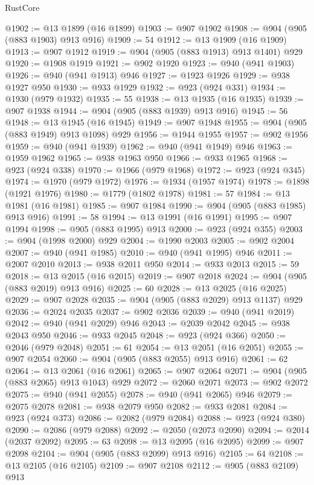 \begin{lexlean}{RustCore}
\begin{coremodule}
@1902 := @13 @1899 (@16 @1899)
@1903 := @907 @1902
@1908 := @904 (@905 (@883 @1903) @913 @916)
@1909 := 54
@1912 := @13 @1909 (@16 @1909)
@1913 := @907 @1912
@1919 := @904 (@905 (@883 @1913) @913 @1401) @929
@1920 := @1908 @1919
@1921 := @902 @1920
@1923 := @940 (@941 @1903)
@1926 := @940 (@941 @1913) @946
@1927 := @1923 @1926
@1929 := @938 @1927 @950
@1930 := @933 @1929
@1932 := @923 (@924 @331)
@1934 := @1930 (@979 @1932)
@1935 := 55
@1938 := @13 @1935 (@16 @1935)
@1939 := @907 @1938
@1944 := @904 (@905 (@883 @1939) @913 @916)
@1945 := 56
@1948 := @13 @1945 (@16 @1945)
@1949 := @907 @1948
@1955 := @904 (@905 (@883 @1949) @913 @1098) @929
@1956 := @1944 @1955
@1957 := @902 @1956
@1959 := @940 (@941 @1939)
@1962 := @940 (@941 @1949) @946
@1963 := @1959 @1962
@1965 := @938 @1963 @950
@1966 := @933 @1965
@1968 := @923 (@924 @338)
@1970 := @1966 (@979 @1968)
@1972 := @923 (@924 @345)
@1974 := @1970 (@979 @1972)
@1976 := @1934 (@1957 @1974)
@1978 := @1898 (@1921 @1976)
@1980 := @1779 (@1802 @1978)
@1981 := 57
@1984 := @13 @1981 (@16 @1981)
@1985 := @907 @1984
@1990 := @904 (@905 (@883 @1985) @913 @916)
@1991 := 58
@1994 := @13 @1991 (@16 @1991)
@1995 := @907 @1994
@1998 := @905 (@883 @1995) @913
@2000 := @923 (@924 @355)
@2003 := @904 (@1998 @2000) @929
@2004 := @1990 @2003
@2005 := @902 @2004
@2007 := @940 (@941 @1985)
@2010 := @940 (@941 @1995) @946
@2011 := @2007 @2010
@2013 := @938 @2011 @950
@2014 := @933 @2013
@2015 := 59
@2018 := @13 @2015 (@16 @2015)
@2019 := @907 @2018
@2024 := @904 (@905 (@883 @2019) @913 @916)
@2025 := 60
@2028 := @13 @2025 (@16 @2025)
@2029 := @907 @2028
@2035 := @904 (@905 (@883 @2029) @913 @1137) @929
@2036 := @2024 @2035
@2037 := @902 @2036
@2039 := @940 (@941 @2019)
@2042 := @940 (@941 @2029) @946
@2043 := @2039 @2042
@2045 := @938 @2043 @950
@2046 := @933 @2045
@2048 := @923 (@924 @366)
@2050 := @2046 (@979 @2048)
@2051 := 61
@2054 := @13 @2051 (@16 @2051)
@2055 := @907 @2054
@2060 := @904 (@905 (@883 @2055) @913 @916)
@2061 := 62
@2064 := @13 @2061 (@16 @2061)
@2065 := @907 @2064
@2071 := @904 (@905 (@883 @2065) @913 @1043) @929
@2072 := @2060 @2071
@2073 := @902 @2072
@2075 := @940 (@941 @2055)
@2078 := @940 (@941 @2065) @946
@2079 := @2075 @2078
@2081 := @938 @2079 @950
@2082 := @933 @2081
@2084 := @923 (@924 @373)
@2086 := @2082 (@979 @2084)
@2088 := @923 (@924 @380)
@2090 := @2086 (@979 @2088)
@2092 := @2050 (@2073 @2090)
@2094 := @2014 (@2037 @2092)
@2095 := 63
@2098 := @13 @2095 (@16 @2095)
@2099 := @907 @2098
@2104 := @904 (@905 (@883 @2099) @913 @916)
@2105 := 64
@2108 := @13 @2105 (@16 @2105)
@2109 := @907 @2108
@2112 := @905 (@883 @2109) @913

\end{coremodule}
\end{lexlean}
